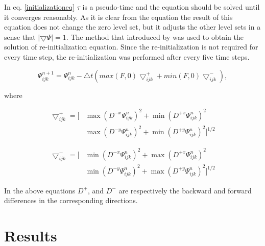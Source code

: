 \documentclass[letterpaper,10pt]{article}
\begin{document}
In eq. \eqref{initializationeq} $\tau$ is a pseudo-time and the equation should be solved until it converges reasonably. 
As it is clear from the equation the result of this equation does not change the zero level set, but it adjusts the other level sets 
in a sense that $|\bigtriangledown \varPsi|=1$.
The method that introduced by \cite{Adalsteinsson1999} was used to obtain the solution of re-initialization equation. Since the re-initialization 
is not required for every time step, the re-initialization was performed after every five time steps.

\begin{equation}
 \varPsi_{ijk}^{n+1}=\varPsi_{ijk}^{n}-\bigtriangleup t \left(max(F,0)\bigtriangledown_{ijk}^{+}+min(F,0)\bigtriangledown_{ijk}^{-} \right),
\end{equation}

where 

\begin{equation}
\begin{aligned}
 \bigtriangledown_{ijk}^{+} = \big[ & \max(D^{-x}\varPsi_{ijk}^{n})^2 + \min(D^{+x}\varPsi_{ijk}^{n})^2
 \\& \max(D^{-y}\varPsi_{ijk}^{n})^2 + \min(D^{+y}\varPsi_{ijk}^{n})^2 \big]^{1/2}
\end{aligned}
\end{equation}
 
\begin{equation}
\begin{aligned}
 \bigtriangledown_{ijk}^{-} = \big[ & \min(D^{-x}\varPsi_{ijk}^{n})^2 + \max(D^{+x}\varPsi_{ijk}^{n})^2
 \\& \min(D^{-y}\varPsi_{ijk}^{n})^2 + \max(D^{+y}\varPsi_{ijk}^{n})^2 \big]^{1/2}
\end{aligned}
\end{equation} 

In the above equations $D^+$, and $D^-$ are  respectively the backward and forward differences in the corresponding directions.


\section{Results} \label{results}
\end{document}
